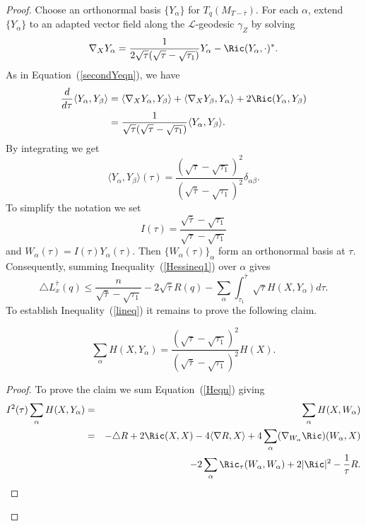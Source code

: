 \begin{proof}
Choose an orthonormal basis $\{Y_{\alpha}\}$ for
$T_q(M_{T-\bar\tau})$. For each $\alpha$, extend $\{Y_{\alpha}\}$ to
an adapted vector field along the $ \mathcal{L}$-geodesic $\gamma_Z$
by solving
$$\nabla_{X}Y_{\alpha} = \frac{1}{2\sqrt{\tau}(\sqrt{\tau}-\sqrt{\tau_1})}Y_{\alpha}
-\Ric(Y_{\alpha},\cdot)^*.$$ As in Equation~(\ref{secondYeqn}),
we have
\begin{align*}
\frac{d}{d\tau}\langle Y_{\alpha},Y_{\beta}\rangle  &= \langle
\nabla_{X}Y_{\alpha},Y_{\beta}\rangle  + \langle
\nabla_{X}Y_{\beta}, Y_{\alpha}\rangle + 2\Ric(Y_{\alpha},Y_{\beta})
\\&= \frac{1}{\sqrt{\tau}(\sqrt{\tau}-\sqrt{\tau_1})}\langle Y_{\alpha},Y_{\beta}\rangle .
\end{align*}
 By integrating we get $$\langle Y_{\alpha},Y_{\beta}\rangle (\tau) =
\frac{(\sqrt{\tau}-\sqrt{\tau_1})^2}{(\sqrt{\bar\tau}-\sqrt{\tau_1})^2}\delta_{\alpha\beta}.$$
To simplify the notation we set
$$I(\tau)=\frac{\sqrt{\bar\tau}-\sqrt{\tau_1}}{\sqrt{\tau}-\sqrt{\tau_1}}$$
and $W_\alpha(\tau)=I(\tau)Y_\alpha(\tau)$.
 Then $\{W_{\alpha}(\tau)\}_\alpha$
form an orthonormal basis at $\tau$. Consequently, summing
Inequality~(\ref{Hessineq1}) over $\alpha$ gives
\begin{equation}\label{triLinequ}
\triangle L_x^{\bar\tau}(q)\le
\frac{n}{\sqrt{\bar\tau}-\sqrt{\tau_1}}
-2\sqrt{\bar\tau}R(q)-\sum_\alpha\int_{\tau_1}^{\bar\tau}\sqrt{\tau}H(X,Y_\alpha)d\tau.\end{equation}
To establish Inequality~(\ref{lineq}) it remains to prove the
following claim.

\begin{claim}\label{claim:h-sum-formula}
\label{Hclaim}
$$\sum_\alpha
H(X,Y_\alpha)=\frac{(\sqrt{\tau}-\sqrt{\tau_1})^2}{(\sqrt{\bar\tau}-\sqrt{\tau_1})^2}H(X).$$
\end{claim}


\begin{proof}
To prove the claim we sum Equation~(\ref{Heqn}) giving
\begin{eqnarray*}
I^2(\tau) \sum_{\alpha}H(X,Y_{\alpha}) &= & \sum_\alpha
H(X,W_\alpha)
\\
& = & -\triangle R + 2\Ric(X,X) - 4\langle \nabla R,X\rangle
+4\sum_{\alpha}(\nabla_{W_\alpha} \Ric)(W_{\alpha},X) \\ & &
-2\sum_{\alpha}\Ric_{\tau}( W_{\alpha},W_{\alpha})  +2|\Ric|^{2} -\frac{1}{\tau}R.
\end{eqnarray*}


\end{proof}
\end{proof}
